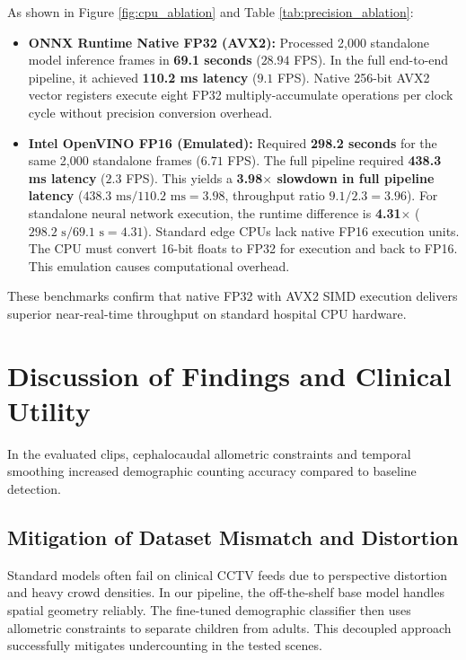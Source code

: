 As shown in Figure \ref{fig:cpu_ablation} and Table \ref{tab:precision_ablation}:
\begin{itemize}
    \item \textbf{ONNX Runtime Native FP32 (AVX2):} Processed 2,000 standalone model inference frames in \textbf{69.1 seconds} ($28.94$ FPS). In the full end-to-end pipeline, it achieved \textbf{110.2 ms latency} ($9.1$ FPS). Native 256-bit AVX2 vector registers execute eight FP32 multiply-accumulate operations per clock cycle without precision conversion overhead.
    \item \textbf{Intel OpenVINO FP16 (Emulated):} Required \textbf{298.2 seconds} for the same 2,000 standalone frames ($6.71$ FPS). The full pipeline required \textbf{438.3 ms latency} ($2.3$ FPS). This yields a \textbf{3.98$\times$ slowdown in full pipeline latency} ($438.3\text{ ms} / 110.2\text{ ms} = 3.98$, throughput ratio $9.1 / 2.3 = 3.96$). For standalone neural network execution, the runtime difference is \textbf{4.31$\times$} ($298.2\text{ s} / 69.1\text{ s} = 4.31$). Standard edge CPUs lack native FP16 execution units. The CPU must convert 16-bit floats to FP32 for execution and back to FP16. This emulation causes computational overhead.
\end{itemize}
These benchmarks confirm that native FP32 with AVX2 SIMD execution delivers superior near-real-time throughput on standard hospital CPU hardware.

\section{Discussion of Findings and Clinical Utility}
In the evaluated clips, cephalocaudal allometric constraints and temporal smoothing increased demographic counting accuracy compared to baseline detection.

\subsection{Mitigation of Dataset Mismatch and Distortion}
Standard models often fail on clinical CCTV feeds due to perspective distortion and heavy crowd densities. In our pipeline, the off-the-shelf base model handles spatial geometry reliably. The fine-tuned demographic classifier then uses allometric constraints to separate children from adults. This decoupled approach successfully mitigates undercounting in the tested scenes.

